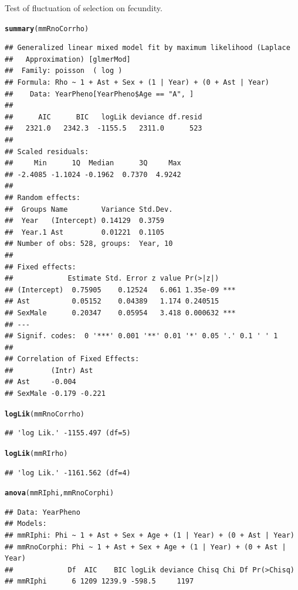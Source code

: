 \documentclass{article}\usepackage[]{graphicx}\usepackage[]{color}
\makeatletter
\newcommand{\hlstd}[1]{\textcolor[rgb]{0.345,0.345,0.345}{#1}}%
\newcommand{\hlkwd}[1]{\textcolor[rgb]{0.737,0.353,0.396}{\textbf{#1}}}%
\newenvironment{kframe}{%
 \def\at@end@of@kframe{}%
 \ifinner\ifhmode%
  \def\at@end@of@kframe{\end{minipage}}%
  \begin{minipage}{\columnwidth}%
 \fi\fi%
 \def\FrameCommand##1{\hskip\@totalleftmargin \hskip-\fboxsep
 \colorbox{shadecolor}{##1}\hskip-\fboxsep
     \hskip-\linewidth \hskip-\@totalleftmargin \hskip\columnwidth}%
 \MakeFramed {\advance\hsize-\width
   \@totalleftmargin\z@ \linewidth\hsize
   \@setminipage}}%
 {\par\unskip\endMakeFramed%
 \at@end@of@kframe}
\newenvironment{knitrout}{}{} %
\makeatother
\begin{document}
Test of fluctuation of selection on fecundity.
\begin{knitrout}
\color{fgcolor}\begin{kframe}
\begin{alltt}
\hlkwd{summary}\hlstd{(mmRnoCorrho)}
\end{alltt}
\begin{verbatim}
## Generalized linear mixed model fit by maximum likelihood (Laplace
##   Approximation) [glmerMod]
##  Family: poisson  ( log )
## Formula: Rho ~ 1 + Ast + Sex + (1 | Year) + (0 + Ast | Year)
##    Data: YearPheno[YearPheno$Age == "A", ]
## 
##      AIC      BIC   logLik deviance df.resid 
##   2321.0   2342.3  -1155.5   2311.0      523 
## 
## Scaled residuals: 
##     Min      1Q  Median      3Q     Max 
## -2.4085 -1.1024 -0.1962  0.7370  4.9242 
## 
## Random effects:
##  Groups Name        Variance Std.Dev.
##  Year   (Intercept) 0.14129  0.3759  
##  Year.1 Ast         0.01221  0.1105  
## Number of obs: 528, groups:  Year, 10
## 
## Fixed effects:
##             Estimate Std. Error z value Pr(>|z|)    
## (Intercept)  0.75905    0.12524   6.061 1.35e-09 ***
## Ast          0.05152    0.04389   1.174 0.240515    
## SexMale      0.20347    0.05954   3.418 0.000632 ***
## ---
## Signif. codes:  0 '***' 0.001 '**' 0.01 '*' 0.05 '.' 0.1 ' ' 1
## 
## Correlation of Fixed Effects:
##         (Intr) Ast   
## Ast     -0.004       
## SexMale -0.179 -0.221
\end{verbatim}
\begin{alltt}
\hlkwd{logLik}\hlstd{(mmRnoCorrho)}
\end{alltt}
\begin{verbatim}
## 'log Lik.' -1155.497 (df=5)
\end{verbatim}
\begin{alltt}
\hlkwd{logLik}\hlstd{(mmRIrho)}
\end{alltt}
\begin{verbatim}
## 'log Lik.' -1161.562 (df=4)
\end{verbatim}
\begin{alltt}
\hlkwd{anova}\hlstd{(mmRIphi,mmRnoCorphi)}
\end{alltt}
\begin{verbatim}
## Data: YearPheno
## Models:
## mmRIphi: Phi ~ 1 + Ast + Sex + Age + (1 | Year) + (0 + Ast | Year)
## mmRnoCorphi: Phi ~ 1 + Ast + Sex + Age + (1 | Year) + (0 + Ast | Year)
##             Df  AIC    BIC logLik deviance Chisq Chi Df Pr(>Chisq)
## mmRIphi      6 1209 1239.9 -598.5     1197                        

\end{verbatim}
\end{kframe}
\end{knitrout}
\end{document}
